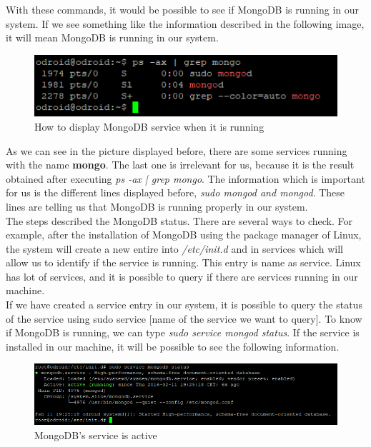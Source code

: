 With these commands, it would be possible to see if MongoDB is running in our system. If we see something like the information described in the following image, it will mean MongoDB is running in our system.\\

\begin{figure}[H]
\begin{centering}
\includegraphics[scale=1]{IMGS/check_mongodb_is_running.PNG}
\caption{How to display MongoDB service when it is running \label{How to display MongoDB service when it is running}}
\end{centering}
\end{figure} 
 
As we can see in the picture displayed before, there are some services running with the name \textbf{mongo}. The last one is irrelevant for us, because it is the result obtained after executing \textit{ps -ax | grep mongo}. The information which is important for us is the different lines displayed before, \textit{sudo mongod and mongod}. These lines are telling us that MongoDB is running properly in our system.\\

The steps described the MongoDB status. There are several ways to check. For example, after the installation of MongoDB using the package manager of Linux, the system will create a new entire into \textit{/etc/init.d} and in services which will allow us to identify if the service is running. This entry is name as service. Linux has lot of services, and it is possible to query if there are services running in our machine.\\

If we have created a service entry in our system, it is possible to query the status of the service using sudo service [name of the service we want to query]. To know if MongoDB is running, we can type \textit{sudo service mongod status}. If the service is installed in our machine, it will be possible to see the following information.\\

\begin{figure}[H]
\begin{centering}
\includegraphics[scale=0.7]{IMGS/mongodb_status.PNG}
\caption{MongoDB's service is active \label{MongoDB's service is active}}
\end{centering}
\end{figure} 
 
